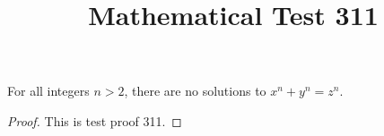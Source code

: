 \documentclass{amsart}
\begin{document}
\title{Mathematical Test 311}
\begin{theorem}
For all integers $n > 2$, there are no solutions to $x^n + y^n = z^n$.
\end{theorem}
\begin{proof}
This is test proof 311.
\end{proof}
\end{document}
